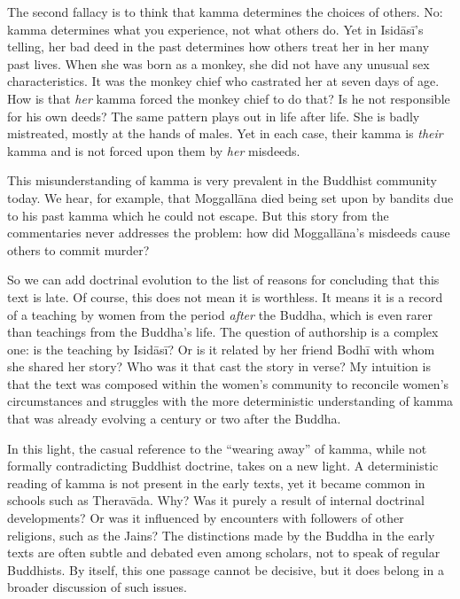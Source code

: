 \documentclass[12pt,openany]{book}%
\begin{document}
The second fallacy is to think that kamma determines the choices of others. No: kamma determines what you experience, not what others do. Yet in \textsanskrit{Isidāsī}’s telling, her bad deed in the past determines how others treat her in her many past lives. When she was born as a monkey, she did not have any unusual sex characteristics. It was the monkey chief who castrated her at seven days of age. How is that \emph{her} kamma forced the monkey chief to do that? Is he not responsible for his own deeds? The same pattern plays out in life after life. She is badly mistreated, mostly at the hands of males. Yet in each case, their kamma is \emph{their} kamma and is not forced upon them by \emph{her} misdeeds.

This misunderstanding of kamma is very prevalent in the Buddhist community today. We hear, for example, that \textsanskrit{Moggallāna} died being set upon by bandits due to his past kamma which he could not escape. But this story from the commentaries never addresses the problem: how did \textsanskrit{Moggallāna}’s misdeeds cause others to commit murder?

So we can add doctrinal evolution to the list of reasons for concluding that this text is late. Of course, this does not mean it is worthless. It means it is a record of a teaching by women from the period \emph{after} the Buddha, which is even rarer than teachings from the Buddha’s life. The question of authorship is a complex one: is the teaching by \textsanskrit{Isidāsī}? Or is it related by her friend \textsanskrit{Bodhī} with whom she shared her story? Who was it that cast the story in verse? My intuition is that the text was composed within the women’s community to reconcile women’s circumstances and struggles with the more deterministic understanding of kamma that was already evolving a century or two after the Buddha.

In this light, the casual reference to the “wearing away” of kamma, while not formally contradicting Buddhist doctrine, takes on a new light. A deterministic reading of kamma is not present in the early texts, yet it became common in schools such as \textsanskrit{Theravāda}. Why? Was it purely a result of internal doctrinal developments? Or was it influenced by encounters with followers of other religions, such as the Jains? The distinctions made by the Buddha in the early texts are often subtle and debated even among scholars, not to speak of regular Buddhists. By itself, this one passage cannot be decisive, but it does belong in a broader discussion of such issues.
\end{document}
